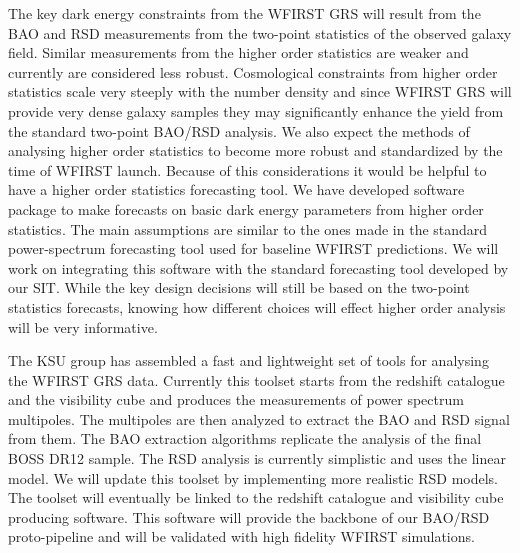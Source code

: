  The key dark energy constraints from the WFIRST GRS will result from the BAO and
 RSD measurements from the two-point statistics of the observed galaxy field.
 Similar measurements from the higher order statistics are weaker and currently
 are considered less robust. Cosmological constraints from higher order
 statistics scale very steeply with the number density and since WFIRST GRS will
 provide very dense galaxy samples they may significantly enhance the yield from
 the standard two-point BAO/RSD analysis. We also expect the methods of analysing
 higher order statistics to become more robust and standardized by the time of
 WFIRST launch. Because of this considerations it would be helpful to have a
 higher order statistics forecasting tool. We have developed software package to
 make forecasts on basic dark energy parameters from higher order statistics.
 The main assumptions are similar to the ones made in the standard
 power-spectrum forecasting tool used for baseline WFIRST predictions. We will
 work on integrating this software with the standard forecasting tool developed
 by our SIT. While the key design decisions will still be based on the
 two-point statistics forecasts, knowing how different choices will effect higher
 order analysis will be very informative.

 The KSU group has assembled a fast and lightweight set of tools for analysing
 the WFIRST GRS data. Currently this toolset starts from the redshift catalogue
 and the visibility cube and produces the measurements of power spectrum
 multipoles. The multipoles are then analyzed to extract the BAO and RSD signal
 from them. The BAO extraction algorithms replicate the analysis of the final
 BOSS DR12 sample. The RSD analysis is currently simplistic and uses the linear
 model. We will update this toolset by implementing more realistic RSD models.
 The toolset will eventually be linked to the redshift catalogue and visibility
 cube producing software. This software will provide the backbone of our BAO/RSD
 proto-pipeline and will be validated with high fidelity WFIRST simulations.
